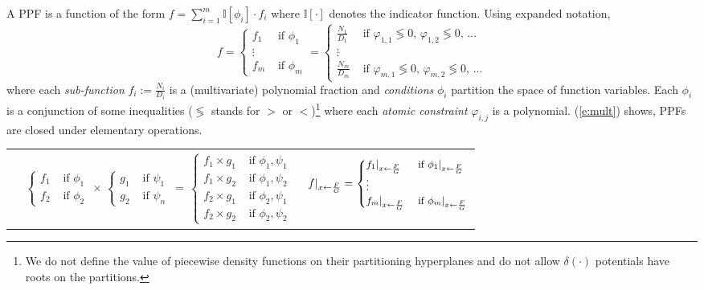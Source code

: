 \documentclass{article} %
\newcommand{\indicator}{\mathbb{I}}%
\newcommand{\case}[2]{#2 &\text{ if } #1}%
\begin{document}
A PPF is a function of the form
$f = \sum_{i=1}^m \indicator[\phi_i]\cdot f_i $ where $\indicator[\cdot]$ denotes the indicator function.
Using expanded notation, 
{\footnotesize
\begin{equation}
\label{e:ppf}
f =
  \begin{cases}
  \case{\phi_1}{f_1}\\
\vdots\\
  \case{\phi_m}{f_m}    
  \end{cases}
\!\!=
  \begin{cases}
  \case{\varphi_{1,1} \lessgtr 0,\, \varphi_{1,2} \lessgtr 0,\, \ldots}{\frac{N_1}{D_1}} \\
\vdots\\
   \case{\varphi_{m,1} \lessgtr 0,\, \varphi_{m,2} \lessgtr 0,\, \ldots}{\frac{N_m}{D_m}}    
  \end{cases}
\end{equation}
}
where each \emph{sub-function} $f_i := \frac{N_i}{D_i}$ is a (multivariate) polynomial fraction and
\emph{conditions} $\phi_i$ partition the space of function variables. 
Each $\phi_i$ is a conjunction of some inequalities ($\lessgtr$ stands for  
$>$ or $<$)\footnote{
We do not define the value of piecewise density functions on their partitioning hyperplanes and do not allow $\delta(\cdot)$ potentials have roots on the partitions. 
} 
where each \emph{atomic constraint} $\varphi_{i,j}$ is a polynomial.
(\ref{e:mult}) shows, PPFs are closed under elementary operations. 
\\
{\footnotesize
\begin{tabular}{p{8cm}p{5.4cm}}
{
\begin{align}\label{e:mult}
&
\begin{cases}
  \case{\phi_1}{f_1}\\
  \case{\phi_2}{f_2}    
  \end{cases}
\,
 \times
\,
  \begin{cases}
  \case{\psi_1}{g_1} \\
  \case{\psi_n}{g_2} 
  \end{cases}
 \, = \,
\begin{cases}
  \case{\phi_1, \psi_1}{f_1 \times g_1} \\ 
  \case{\phi_1, \psi_2}{f_1 \times g_2} \\
  \case{\phi_2, \psi_1}{f_2 \times g_1} \\
  \case{\phi_2, \psi_2}{f_2 \times g_2}
  \end{cases}
\end{align} }
&{
\begin{align}\label{e:substitute}
\footnotesize
f|_{x \leftarrow \frac{F}{G}}
=
\begin{cases}
  \case{{\phi_1}|_{x \leftarrow \frac{F}{G}}}{{f_1}|_{x \leftarrow \frac{F}{G}}}\\
\vdots\\
  \case{{\phi_m}|_{x \leftarrow \frac{F}{G}}}{{f_m}|_{x \leftarrow \frac{F}{G}}}    
  \end{cases}
\end{align} 
}
\end{tabular}
}
\end{document}
